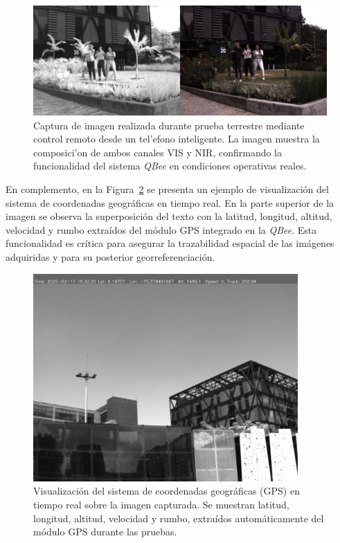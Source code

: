         \begin{figure}[h]
        \centering
        \includegraphics[width=1\textwidth]{Figures/C4/captured_image_20240201_174102.jpg}
        \caption{Captura de imagen realizada durante prueba terrestre mediante control remoto desde un tel'efono inteligente. La imagen muestra la composici'on de ambos canales VIS y NIR, confirmando la funcionalidad del sistema \textit{QBee} en condiciones operativas reales.}
        \label{fig:captura_prueba_remota}
        \end{figure}
        
        \noindent En complemento, en la Figura~\ref{fig:gps_overlay_visual} se presenta un ejemplo de visualización del sistema de coordenadas geográficas en tiempo real. En la parte superior de la imagen se observa la superposición del texto con la latitud, longitud, altitud, velocidad y rumbo extraídos del módulo GPS integrado en la \textit{QBee}. Esta funcionalidad es crítica para asegurar la trazabilidad espacial de las imágenes adquiridas y para su posterior georreferenciación.

        \begin{figure}[h]
            \centering
            \includegraphics[width=0.9\textwidth]{Figures/C4/captured_image_20250217_113221.jpg}
            \caption{Visualización del sistema de coordenadas geográficas (GPS) en tiempo real sobre la imagen capturada. Se muestran latitud, longitud, altitud, velocidad y rumbo, extraídos automáticamente del módulo GPS durante las pruebas.}
            \label{fig:gps_overlay_visual}
        \end{figure}



